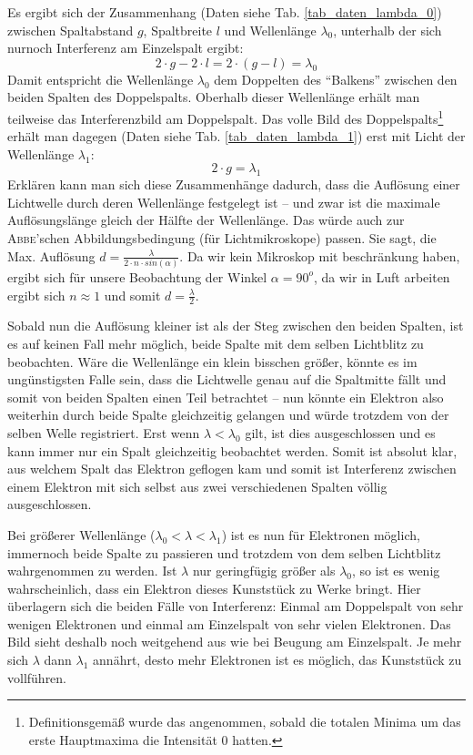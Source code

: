 Es ergibt sich der Zusammenhang (Daten siehe Tab. \ref{tab_daten_lambda_0}) zwischen Spaltabstand $g$, Spaltbreite $l$ und Wellenlänge $\lambda_0$, unterhalb der sich nurnoch Interferenz am Einzelspalt ergibt:
\begin{equation}
   2 \cdot g - 2 \cdot l = 2 \cdot (g - l) = \lambda_0
\end{equation}
Damit entspricht die Wellenlänge $\lambda_0$ dem Doppelten des "`Balkens"' zwischen den beiden Spalten des Doppelspalts. Oberhalb dieser Wellenlänge erhält man teilweise das Interferenzbild am Doppelspalt. Das volle Bild des Doppelspalts\footnote{Definitionsgemäß wurde das angenommen, sobald die totalen Minima um das erste Hauptmaxima die Intensität $0$ hatten.} erhält man dagegen (Daten siehe Tab. \ref{tab_daten_lambda_1}) erst mit Licht der Wellenlänge $\lambda_1$:
\begin{equation}
   2 \cdot g = \lambda_1
\end{equation}
Erklären kann man sich diese Zusammenhänge dadurch, dass die Auflösung einer Lichtwelle durch deren Wellenlänge festgelegt ist -- und zwar ist die maximale Auflösungslänge gleich der Hälfte der Wellenlänge. Das würde auch zur \textsc{Abbe}'schen Abbildungsbedingung (für Lichtmikroskope) passen. Sie sagt, die Max. Auflösung $d = \frac{\lambda}{2 \cdot n \cdot sin(\alpha)}$. Da wir kein Mikroskop mit beschränkung haben, ergibt sich für unsere Beobachtung der Winkel $\alpha = 90^o$, da wir in Luft arbeiten ergibt sich $n \approx 1$ und somit $d = \frac{\lambda}{2}$.

Sobald nun die Auflösung kleiner ist als der Steg zwischen den beiden Spalten, ist es auf keinen Fall mehr möglich, beide Spalte mit dem selben Lichtblitz zu beobachten. Wäre die Wellenlänge ein klein bisschen größer, könnte es im ungünstigsten Falle sein, dass die Lichtwelle genau auf die Spaltmitte fällt und somit von beiden Spalten einen Teil betrachtet -- nun könnte ein Elektron also weiterhin durch beide Spalte gleichzeitig gelangen und würde trotzdem von der selben Welle registriert. Erst wenn $\lambda < \lambda_0$ gilt, ist dies ausgeschlossen und es kann immer nur ein Spalt gleichzeitig beobachtet werden. Somit ist absolut klar, aus welchem Spalt das Elektron geflogen kam und somit ist Interferenz zwischen einem Elektron mit sich selbst aus zwei verschiedenen Spalten völlig ausgeschlossen.

Bei größerer Wellenlänge ($\lambda_0 < \lambda < \lambda_1$) ist es nun für Elektronen möglich, immernoch beide Spalte zu passieren und trotzdem von dem selben Lichtblitz wahrgenommen zu werden. Ist $\lambda$ nur geringfügig größer als $\lambda_0$, so ist es wenig wahrscheinlich, dass ein Elektron dieses Kunststück zu Werke bringt. Hier überlagern sich die beiden Fälle von Interferenz: Einmal am Doppelspalt von sehr wenigen Elektronen und einmal am Einzelspalt von sehr vielen Elektronen. Das Bild sieht deshalb noch weitgehend aus wie bei Beugung am Einzelspalt. Je mehr sich $\lambda$ dann $\lambda_1$ annährt, desto mehr Elektronen ist es möglich, das Kunststück zu vollführen.

